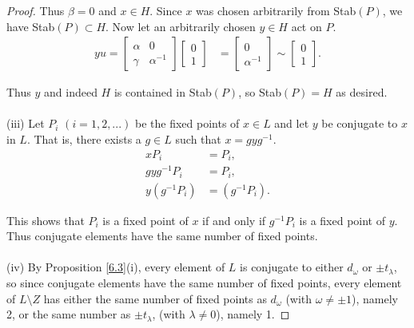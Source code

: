 \begin{proof}
Thus $\beta = 0$ and $x \in H$. Since $x$ was chosen arbitrarily from Stab$(P)$, we have Stab$(P) \subset H$. Now let an arbitrarily chosen $y \in H$ act on $P$. \\
\begin{align*} y u = \begin{bmatrix} \alpha & 0 \\ \gamma & \alpha^{-1} \end{bmatrix} \begin{bmatrix} 0 \\ 1 \end{bmatrix} &= \begin{bmatrix} 0 \\ \alpha^{-1} \end{bmatrix} \sim \begin{bmatrix} 0 \\ 1 \end{bmatrix}.
\end{align*}

Thus $y$ and indeed $H$ is contained in Stab$(P)$, so Stab$(P) = H$ as desired. \\
\\
(iii) Let $P_i$ $(i = 1,2,...)$ be the fixed points of $x\in L$ and let $y$ be conjugate to $x$ in $L$. That is, there exists a $g \in L$ such that $x = gyg^{-1}$.
\begin{align*} x P_i &= P_i,
\\ gyg^{-1} P_i &= P_i,
\\ y(g^{-1} P_i) &= (g^{-1} P_i).
\end{align*}

This shows that $P_i$ is a fixed point of $x$ if and only if $g^{-1} P_i$ is a fixed point of $y$. Thus conjugate elements have the same number of fixed points. \\
\\
(iv) By Proposition \ref{6.3}(i), every  element of $L$ is conjugate to either $d_\omega$ or $\pm t_\lambda$, so since conjugate elements have the same number of fixed points, every element of $L \! \setminus \! Z$ has either the same number of fixed points as $d_\omega$ (with $\omega \neq \pm 1$), namely 2, or the same number as $\pm t_\lambda$, (with $\lambda \neq 0$), namely 1.

\end{proof}



